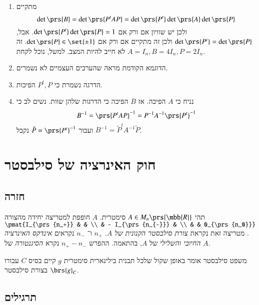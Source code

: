 \documentclass[a4paper,10pt,oneside,openany]{article}
\begin{document}
\begin{solution}
\begin{enumerate}
\item מתקיים
\[\det\prs{B} = \det\prs{P^t A P} = \det\prs{P^t} \det\prs{A} \det\prs{P}\]
ולכן יש שוויון אם ורק אם
$\det\prs{P^t} \det\prs{P} = 1$.
אבל,
$\det\prs{P^t} = \det\prs{P}$
ולכן זה מתקיים אם ורק אם
$\det\prs{P} \in \set{\pm 1}$.
זה לא חייב להיות המצב. למשל, נוכל לקחת
$A = I_n, B = 4I_n, P = 2I_n$.

\item הדוגמא הקודמת מראה שהערכים העצמיים לא נשמרים.

\item הדרגה נשמרת כי
$P^t, P$
הפיכות.

\item נניח כי
$A$
הפיכה. אז
$B$
הפיכה כי הדרגות שלהן שוות.
נשים לב כי
\[B^{-1} = \prs{P^t A P}^{-1} = P^{-1} A^{-1} \prs{P^t}^{-1}\]
ועבור
$\tilde{P} = \prs{P^t}^{-1}$
נקבל
$B^{-1} = \tilde{P}^t A^{-1} \tilde{P}$.
\end{enumerate}
\end{solution}

\section{חוק האינרציה של סילבסטר}

\subsection{חזרה}

\begin{theorem}[סילבסטר]
תהי
$A \in M_n\prs{\mbb{R}}$
סימטרית.
$A$
חופפת למטריצה יחידה מהצורה
$\pmat{I_{\prs{n_+}} & & \\ & - I_{\prs{n_{-}}} & \\ & & 0_{\prs{n_0}}}$.
מטריצה זאת נקראת
\emph{צורת סילבסטר הקנונית של
$A$}.
$n_+$
ו־%
$n_-$
נקראים
\emph{אינדקס האינרציה החיובי והשלילי}
של
$A$,
בהתאמה.
ההפרש
$n_+ - n_-$
נקרא
\emph{הסיגנטורה}
של
$A$.
\end{theorem}

\begin{remark}
משפט סילבסטר אומר באופן שקול שלכל תבנית בילינארית סימטרית
$g$
קיים בסיס
$C$
עבורו
$\brs{g}_C$
בצורת סילבסטר.
\end{remark}

\subsection{תרגילים}
\end{document}
